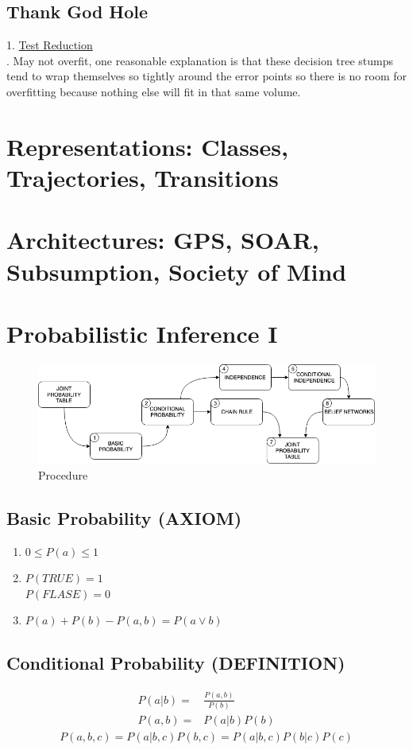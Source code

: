 \documentclass[12pt]{book}
\begin{document}
\subsection{Thank God Hole} 1. \href{https://www.youtube.com/watch?v=UHBmv7qCey4&list=PLUl4u3cNGP63gFHB6xb-kVBiQHYe_4hSi&index=18#t=46m44s}{Test Reduction}\\
. May not overfit, one reasonable explanation is that these decision tree stumps tend to wrap themselves so tightly around the error points so there is no room for overfitting because nothing else will fit in that same volume.
\newpage
\section{Representations: Classes, Trajectories, Transitions}

\newpage
\section{Architectures: GPS, SOAR, Subsumption, Society of Mind}

\newpage
\section{Probabilistic Inference I}
\begin{figure}[ht]
	\centering
	\includegraphics[scale=0.62]{Figure/Figure20_1.png}
	\caption{Procedure}
\end{figure}
\subsection{Basic Probability (AXIOM)}
\begin{enumerate}
	\item $0\leq P(a)\leq 1$
	\item $P(TRUE)=1$\\
			$P(FLASE)=0$
	\item $P(a)+P(b)-P(a,b)=P(a\vee b)$
\end{enumerate}
\subsection{Conditional Probability (DEFINITION)}
\begin{equation*}
\begin{aligned}
	P(a|b)=&\frac{P(a,b)}{P(b)}\\
	P(a,b)=&P(a|b)P(b)
\end{aligned}
\end{equation*}
\begin{equation*}
\begin{aligned}
P(a,b,c)=P(a|b,c)P(b,c)=P(a|b,c)P(b|c)P(c)
\end{aligned}
\end{equation*}
\end{document}
